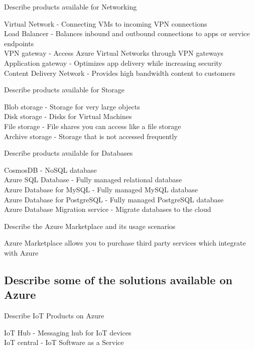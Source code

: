 \documentclass[addpoints]{exam}
\begin{document}
\begin{questions}
\question Describe products available for Networking
\begin{solution}[2in]
	Virtual Network - Connecting VMs to incoming VPN connections\\
	Load Balancer - Balances inbound and outbound connections to apps or service endpoints\\
	VPN gateway - Access Azure Virtual Networks through VPN gateways\\
	Application gateway - Optimizes app delivery while increasing security\\
	Content Delivery Network - Provides high bandwidth content to customers
\end{solution}

\question Describe products available for Storage
\begin{solution}[2in]
	Blob storage - Storage for very large objects\\
	Disk storage - Disks for Virtual Machines\\
	File storage - File shares you can access like a file storage\\
	Archive storage - Storage that is not accessed frequently
\end{solution}

\question Describe products available for Databases
\begin{solution}[2in]
	CosmosDB - NoSQL database\\
	Azure SQL Database - Fully managed relational database\\
	Azure Database for MySQL - Fully managed MySQL database\\
	Azure Database for PostgreSQL - Fully managed PostgreSQL database\\
	Azure Database Migration service - Migrate databases to the cloud
\end{solution}

\question Describe the Azure Marketplace and its usage scenarios
\begin{solution}[2in]
	Azure Marketplace allows you to purchase third party services which integrate with Azure
\end{solution}
\subsection{Describe some of the solutions available on Azure}
\question Describe IoT Products on Azure
\begin{solution}[2in]
	IoT Hub - Messaging hub for IoT devices\\
	IoT central - IoT Software as a Service
\end{solution}


\end{questions}
\end{document}
